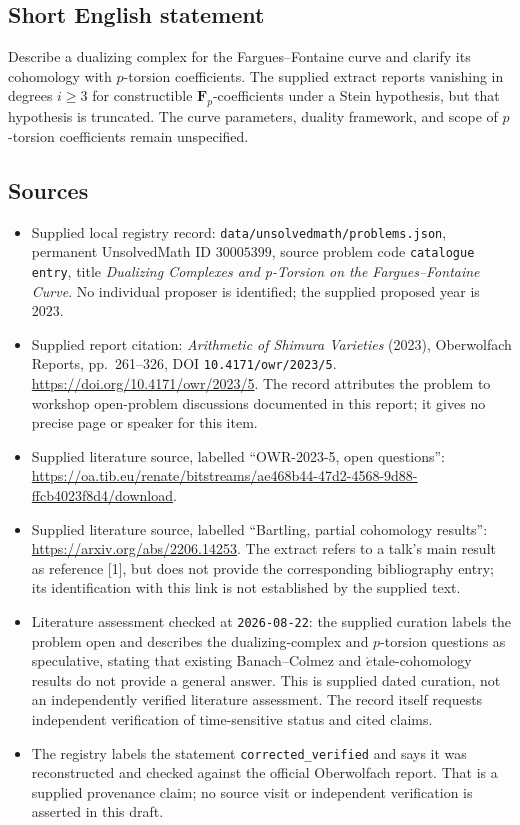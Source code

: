 \documentclass[11pt]{article}
\begin{document}
\subsection{Short English statement}
Describe a dualizing complex for the Fargues--Fontaine curve and clarify its cohomology with \(p\)-torsion coefficients. The supplied extract reports vanishing in degrees \(i\geq 3\) for constructible \(\mathbf F_p\)-coefficients under a Stein hypothesis, but that hypothesis is truncated. The curve parameters, duality framework, and scope of \(p\)-torsion coefficients remain unspecified.
\subsection{Sources}
\begin{itemize}
\item Supplied local registry record: \texttt{data/unsolvedmath/problems.json}, permanent UnsolvedMath ID \(30005399\), source problem code \texttt{catalogue entry}, title \emph{Dualizing Complexes and p-Torsion on the Fargues--Fontaine Curve}. No individual proposer is identified; the supplied proposed year is \(2023\).
\item Supplied report citation: \emph{Arithmetic of Shimura Varieties} (2023), Oberwolfach Reports, pp.\ 261--326, DOI \texttt{10.4171/owr/2023/5}. \url{https://doi.org/10.4171/owr/2023/5}. The record attributes the problem to workshop open-problem discussions documented in this report; it gives no precise page or speaker for this item.
\item Supplied literature source, labelled ``OWR-2023-5, open questions'': \url{https://oa.tib.eu/renate/bitstreams/ae468b44-47d2-4568-9d88-ffcb4023f8d4/download}.
\item Supplied literature source, labelled ``Bartling, partial cohomology results'': \url{https://arxiv.org/abs/2206.14253}. The extract refers to a talk's main result as reference [1], but does not provide the corresponding bibliography entry; its identification with this link is not established by the supplied text.
\item Literature assessment checked at \texttt{2026-08-22}: the supplied curation labels the problem open and describes the dualizing-complex and \(p\)-torsion questions as speculative, stating that existing Banach--Colmez and \(\acute{e}\)tale-cohomology results do not provide a general answer. This is supplied dated curation, not an independently verified literature assessment. The record itself requests independent verification of time-sensitive status and cited claims.
\item The registry labels the statement \texttt{corrected\_verified} and says it was reconstructed and checked against the official Oberwolfach report. That is a supplied provenance claim; no source visit or independent verification is asserted in this draft.
\end{itemize}
\end{document}
